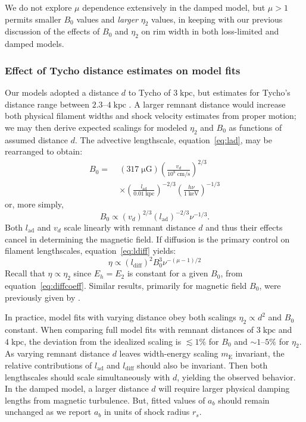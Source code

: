 \documentclass[iop, apj, numberedappendix]{emulateapj}
\newcommand*{\mt}{\mathrm}
\newcommand*{\unit}[1]{\;\mt{#1}}  %
\newcommand*{\abt}{\mathord{\sim}} %
\newcommand*{\mE}{m_\mt{E}}
\newcommand*{\muG}{\unit{\mu G}}
\begin{document}
We do not explore $\mu$ dependence extensively in the damped model, but
$\mu > 1$ permits smaller $B_0$ values and \emph{larger} $\eta_2$ values, in
keeping with our previous discussion of the effects of $B_0$ and $\eta_2$ on
rim width in both loss-limited and damped models.

\subsubsection{Effect of Tycho distance estimates on model fits}

Our models adopted a distance $d$ to Tycho of $3 \unit{kpc}$, but estimates for
Tycho's distance range between $2.3$--$4 \unit{kpc}$ \citep{hayato2010}.  A
larger remnant distance would increase both physical filament widths and shock
velocity estimates from proper motion; we may then derive expected scalings for
modeled $\eta_2$ and $B_0$ as functions of assumed distance $d$.  The advective
lengthscale, equation~\eqref{eq:lad}, may be rearranged to obtain:
\begin{align}
    B_0 =\; &(317 \muG) \left(\frac{v_d}{10^8 \unit{cm/s}}\right)^{2/3}
                \nonumber \\
            &\times \left(\frac{l_{\mt{ad}}}{0.01 \unit{kpc}}\right)^{-2/3}
                \left(\frac{h\nu}{1 \unit{keV}}\right)^{-1/3}
\end{align}
or, more simply,
\begin{equation}
    B_0 \propto \left(v_d\right)^{2/3}
                \left(l_{\mt{ad}}\right)^{-2/3} \nu^{-1/3} .
\end{equation}
Both $l_{\mt{ad}}$ and $v_d$ scale linearly with remnant distance $d$ and thus
their effects cancel in determining the magnetic field.  If diffusion is the
primary control on filament lengthscales, equation~\eqref{eq:ldiff} yields:
\begin{equation}
    \eta \propto \left(l_{\mt{diff}}\right)^2 B_0^{3} \nu^{-(\mu - 1)/2}
\end{equation}
Recall that $\eta \propto \eta_2$ since $E_h = E_2$ is constant for a given
$B_0$, from equation~\eqref{eq:diffcoeff}.  Similar results, primarily for
magnetic field $B_0$, were previously given by \citet{parizot2006}.

In practice, model fits with varying distance obey both scalings $\eta_2
\propto d^2$ and $B_0$ constant.  When comparing full model fits with remnant
distances of $3 \unit{kpc}$ and $4 \unit{kpc}$, the deviation from the
idealized scaling is $\lesssim 1 \%$ for $B_0$ and $\abt 1$--$5\%$ for
$\eta_2$.  As varying remnant distance $d$ leaves width-energy scaling $\mE$
invariant, the relative contributions of $l_{\mt{ad}}$ and $l_{\mt{diff}}$
should also be invariant.  Then both lengthscales should scale simultaneously
with $d$, yielding the observed behavior.  In the damped model, a larger
distance $d$ will require larger physical damping lengths from magnetic
turbulence.  But, fitted values of $a_b$ should remain unchanged as we report
$a_b$ in units of shock radius $r_s$.
\end{document}
